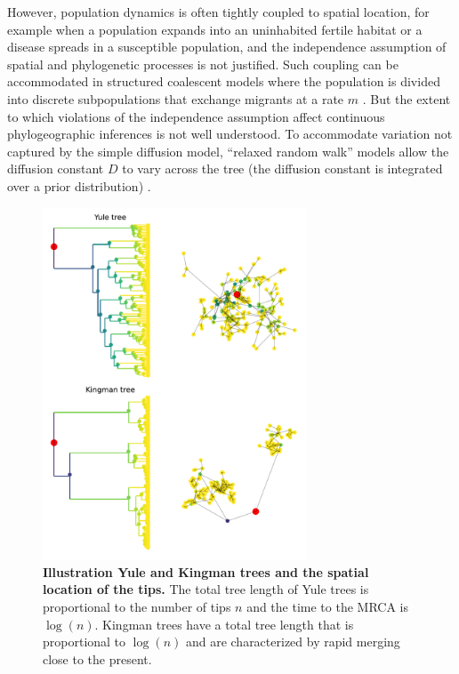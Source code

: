 \documentclass[aps,rmp, twocolumn]{revtex4}
\begin{document}
However, population dynamics is often tightly coupled to spatial location, for example when a population expands into an uninhabited fertile habitat or a disease spreads in a susceptible population, and the independence assumption of spatial and phylogenetic processes is not justified.
Such coupling can be accommodated in structured coalescent models where the population is divided into discrete subpopulations that exchange migrants at a rate $m$ \citep{vaughan_efficient_2014}.
But the extent to which violations of the independence assumption affect continuous phylogeographic inferences is not well understood.
To accommodate variation not captured by the simple diffusion model, ``relaxed random walk'' models allow the diffusion constant $D$ to vary across the tree (the diffusion constant is integrated over a prior distribution) \citep{dellicour_relax_2021,lemey_phylogeography_2010}.

\begin{figure}[tb]
    \includegraphics*[width=0.7\textwidth]{figures/illustration_tree.pdf}
    \caption{\label{fig:illustration_tree}{\bf Illustration Yule and Kingman trees and the spatial location of the tips.}
    The total tree length of Yule trees is proportional to the number of tips $n$ and the time to the MRCA is $\log(n)$.
    Kingman trees have a total tree length that is proportional to $\log(n)$ and are characterized by rapid merging close to the present. }
\end{figure}
\end{document}
